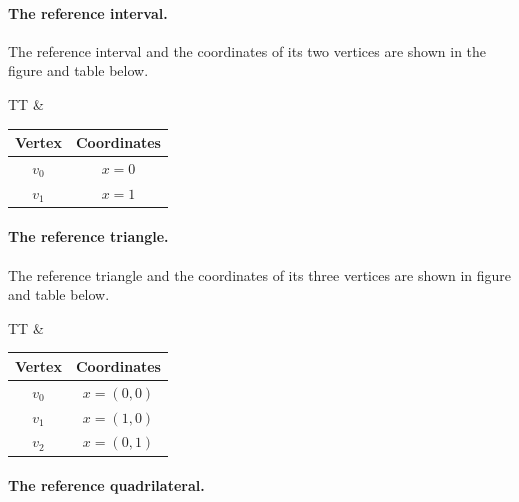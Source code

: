 \paragraph{The reference interval.}

The reference interval and the coordinates of its two vertices are
shown in the figure and table below.


\begin{center}
  \begin{tabular}{TT}
    &
    \begin{tabular}{cc}
      \toprule
      Vertex & Coordinates \\
      \hline
      $v_0$ & $x = 0$ \\
      $v_1$ & $x = 1$ \\
      \bottomrule
    \end{tabular}
  \end{tabular}
\end{center}

\paragraph{The reference triangle.}

The reference triangle and the coordinates of its three vertices are
shown in figure and table below.

\begin{center}
\bwfig
  \begin{tabular}{TT}
    &
    \begin{tabular}{cc}
      \toprule
      Vertex & Coordinates \\
      \hline
      $v_0$ & $x = (0, 0)$ \\
      $v_1$ & $x = (1, 0)$ \\
      $v_2$ & $x = (0, 1)$ \\
      \bottomrule
    \end{tabular}
  \end{tabular}
\end{center}

\paragraph{The reference quadrilateral.}

